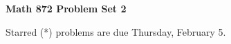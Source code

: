 \documentclass[12pt]{article}
\begin{document}
\def\ctln{\centerline}
\def\msk{\medskip}
\def\bsk{\bigskip}
\def\ssk{\smallskip}
\def\hsk{\hskip.3in}
\def\ra{\rightarrow}
\def\ubr{\underbar}

\def\mt{{\mathcal T}}
\def\mb{{\mathcal B}}
\def\ms{{\mathcal S}}
\def\mu{{\mathcal U}}
\def\mv{{\mathcal V}}

\def\bbr{{\mathbb R}}
\def\bbz{{\mathbb Z}}
\def\bbq{{\mathbb Q}}
\def\spc{$~$\hskip.15in$~$}

\def\sset{\subseteq}
\def\del{\partial}
\def\lra{$\Leftrightarrow$}
\def\bra{$\Rightarrow$}




\ctln{\bf Math 872 Problem Set 2}

\msk

Starred (*) problems are due Thursday, February 5.
\end{document}
